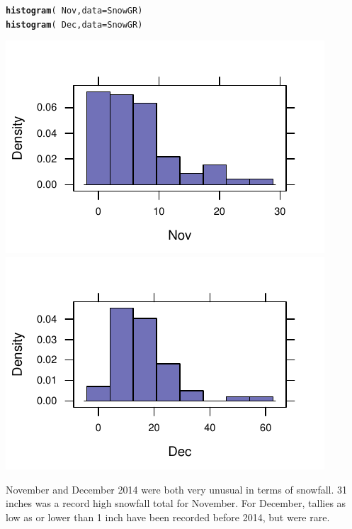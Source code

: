 \documentclass[twoside]{book}\usepackage[]{graphicx}\usepackage[]{xcolor}
\makeatletter
\def\maxwidth{ %
  \ifdim\Gin@nat@width>\linewidth
    \linewidth
  \else
    \Gin@nat@width
  \fi
}
\newcommand{\hlopt}[1]{\textcolor[rgb]{0,0,0}{#1}}%
\newcommand{\hlstd}[1]{\textcolor[rgb]{0.345,0.345,0.345}{#1}}%
\newcommand{\hlkwc}[1]{\textcolor[rgb]{0.333,0.667,0.333}{#1}}%
\newcommand{\hlkwd}[1]{\textcolor[rgb]{0.737,0.353,0.396}{\textbf{#1}}}%
\newenvironment{kframe}{%
 \def\at@end@of@kframe{}%
 \ifinner\ifhmode%
  \def\at@end@of@kframe{\end{minipage}}%
  \begin{minipage}{\columnwidth}%
 \fi\fi%
 \def\FrameCommand##1{\hskip\@totalleftmargin \hskip-\fboxsep
 \colorbox{shadecolor}{##1}\hskip-\fboxsep
     \hskip-\linewidth \hskip-\@totalleftmargin \hskip\columnwidth}%
 \MakeFramed {\advance\hsize-\width
   \@totalleftmargin\z@ \linewidth\hsize
   \@setminipage}}%
 {\par\unskip\endMakeFramed%
 \at@end@of@kframe}
\newenvironment{knitrout}{}{} %
\makeatother
\begin{document}
\begin{solution}
\begin{knitrout}
\color{fgcolor}\begin{kframe}
\begin{alltt}
\hlkwd{histogram}\hlstd{(}\hlopt{~}\hlstd{Nov,} \hlkwc{data} \hlstd{= SnowGR)}
\hlkwd{histogram}\hlstd{(}\hlopt{~}\hlstd{Dec,} \hlkwc{data} \hlstd{= SnowGR)}
\end{alltt}
\end{kframe}

{\centering \includegraphics[width=\maxwidth]{figures/fig-unnamed-chunk-38-1} 
\includegraphics[width=\maxwidth]{figures/fig-unnamed-chunk-38-2} 

}



\end{knitrout}
November and December 2014 were both very unusual in terms of snowfall. 31 inches was a record high snowfall
total for November.  For December, tallies as low as or lower than 1 inch have been recorded before 2014, 
but were rare.


\end{solution}
\end{document}
